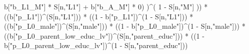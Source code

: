 \documentclass[
]{book}
\newenvironment{Shaded}{\begin{snugshade}}{\end{snugshade}}
\newcommand{\DecValTok}[1]{\textcolor[rgb]{0.00,0.00,0.81}{#1}}
\newcommand{\NormalTok}[1]{#1}
\newcommand{\SpecialCharTok}[1]{\textcolor[rgb]{0.00,0.00,0.00}{#1}}
\newcommand{\StringTok}[1]{\textcolor[rgb]{0.31,0.60,0.02}{#1}}
\begin{document}
\begin{Shaded}
\begin{Highlighting}[]
\NormalTok{              b[}\StringTok{"b\_L1\_M"}\NormalTok{] }\SpecialCharTok{*}\NormalTok{ S[n,}\StringTok{"L1"}\NormalTok{] }\SpecialCharTok{+}
\NormalTok{              b[}\StringTok{"b\_A\_M"}\NormalTok{] }\SpecialCharTok{*} \DecValTok{0}\NormalTok{) )}\SpecialCharTok{\^{}}\NormalTok{( }\DecValTok{1} \SpecialCharTok{{-}}\NormalTok{ S[n,}\StringTok{"M"}\NormalTok{] ))  }\SpecialCharTok{*}
\NormalTok{    ((b[}\StringTok{"p\_L1"}\NormalTok{])}\SpecialCharTok{\^{}}\NormalTok{(S[n,}\StringTok{"L1"}\NormalTok{])) }\SpecialCharTok{*}
\NormalTok{    ((}\DecValTok{1} \SpecialCharTok{{-}}\NormalTok{ b[}\StringTok{"p\_L1"}\NormalTok{])}\SpecialCharTok{\^{}}\NormalTok{(}\DecValTok{1} \SpecialCharTok{{-}}\NormalTok{ S[n,}\StringTok{"L1"}\NormalTok{])) }\SpecialCharTok{*}
\NormalTok{    ((b[}\StringTok{"p\_L0\_male"}\NormalTok{])}\SpecialCharTok{\^{}}\NormalTok{(S[n,}\StringTok{"male"}\NormalTok{])) }\SpecialCharTok{*} 
\NormalTok{    ((}\DecValTok{1} \SpecialCharTok{{-}}\NormalTok{ b[}\StringTok{"p\_L0\_male"}\NormalTok{])}\SpecialCharTok{\^{}}\NormalTok{(}\DecValTok{1} \SpecialCharTok{{-}}\NormalTok{ S[n,}\StringTok{"male"}\NormalTok{])) }\SpecialCharTok{*} 
\NormalTok{    ((b[}\StringTok{"p\_L0\_parent\_low\_educ\_lv"}\NormalTok{])}\SpecialCharTok{\^{}}\NormalTok{(S[n,}\StringTok{"parent\_educ"}\NormalTok{])) }\SpecialCharTok{*}
\NormalTok{    ((}\DecValTok{1} \SpecialCharTok{{-}}\NormalTok{ b[}\StringTok{"p\_L0\_parent\_low\_educ\_lv"}\NormalTok{])}\SpecialCharTok{\^{}}\NormalTok{(}\DecValTok{1} \SpecialCharTok{{-}}\NormalTok{ S[n,}\StringTok{"parent\_educ"}\NormalTok{])) }
    

\end{Highlighting}
\end{Shaded}
\end{document}
